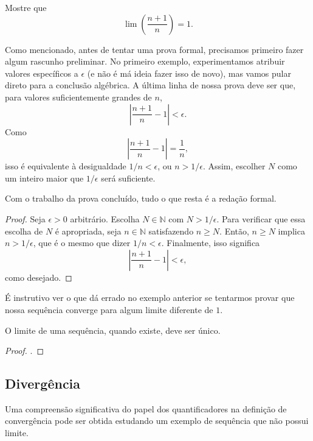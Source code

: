 \begin{example}\label{exmpl:2-2-6}
Mostre que
\[
\lim \left( \frac{n+1}{n} \right) = 1.
\]

Como mencionado, antes de tentar uma prova formal, precisamos primeiro fazer algum rascunho preliminar. No primeiro exemplo, experimentamos atribuir valores específicos a $\epsilon$ (e não é má ideia fazer isso de novo), mas vamos pular direto para a conclusão algébrica. A última linha de nossa prova deve ser que, para valores suficientemente grandes de $n$,
\[
\left| \frac{n+1}{n} - 1 \right| < \epsilon.
\]
Como
\[
\left| \frac{n+1}{n} - 1 \right| = \frac{1}{n},
\]
isso é equivalente à desigualdade $1/n < \epsilon$, ou $n > 1/\epsilon$. Assim, escolher $N$ como um inteiro maior que $1/\epsilon$ será suficiente.

Com o trabalho da prova concluído, tudo o que resta é a redação formal.

\begin{proof}
Seja $\epsilon > 0$ arbitrário. Escolha $N \in \mathbb{N}$ com $N > 1/\epsilon$. Para verificar que essa escolha de $N$ é apropriada, seja $n \in \mathbb{N}$ satisfazendo $n \geq N$. Então, $n \geq N$ implica $n > 1/\epsilon$, que é o mesmo que dizer $1/n < \epsilon$. Finalmente, isso significa
\[
\left| \frac{n+1}{n} - 1 \right| < \epsilon,
\]
como desejado.
\end{proof}
\end{example}

É instrutivo ver o que dá errado no exemplo anterior se tentarmos provar que nossa sequência converge para algum limite diferente de $1$.

\begin{theorem}\label{thm:unicidade-limite}
O limite de uma sequência, quando existe, deve ser único.
\end{theorem}

\begin{proof}
.
\end{proof}

\subsection{Divergência}

Uma compreensão significativa do papel dos quantificadores na definição de convergência pode ser obtida estudando um exemplo de sequência que não possui limite.

